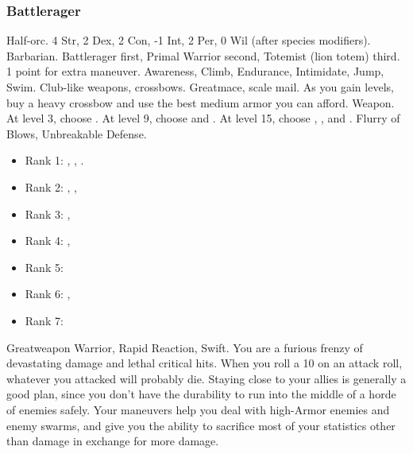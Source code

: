         \subsubsection{Battlerager}
             Half-orc.
             4 Str, 2 Dex, 2 Con, -1 Int, 2 Per, 0 Wil (after species modifiers).
             Barbarian.
             Battlerager first, Primal Warrior second, Totemist (lion totem) third.
             1 point for extra maneuver.
             Awareness, Climb, Endurance, Intimidate, Jump, Swim.
             Club-like weapons, crossbows.
             Greatmace, scale mail. As you gain levels, buy a heavy crossbow and use the best medium armor you can afford.
             Weapon.
                At level 3, choose .
                At level 9, choose  and .
                At level 15, choose , , and .
             Flurry of Blows, Unbreakable Defense.
            \begin{itemize}
                \item Rank 1: , , .
                \item Rank 2: , , 
                \item Rank 3: , 
                \item Rank 4: , 
                \item Rank 5: 
                \item Rank 6: , 
                \item Rank 7: 
            \end{itemize}
             Greatweapon Warrior, Rapid Reaction, Swift.
             You are a furious frenzy of devastating damage and lethal critical hits.
            When you roll a 10 on an attack roll, whatever you attacked will probably die.
            Staying close to your allies is generally a good plan, since you don't have the durability to run into the middle of a horde of enemies safely.
            Your maneuvers help you deal with high-Armor enemies and enemy swarms, and give you the ability to sacrifice most of your statistics other than damage in exchange for more damage.

